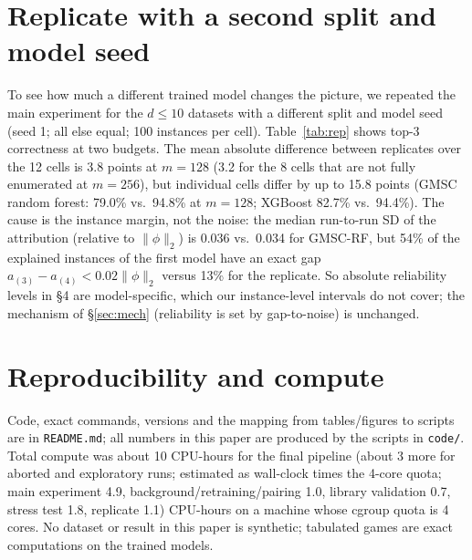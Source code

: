 \documentclass{article}
\begin{document}
\section{Replicate with a second split and model seed}\label{app:rep}
To see how much a different trained model changes the picture, we repeated the main experiment for the $d\le10$ datasets with a different split and model seed (seed 1; all else equal; 100 instances per cell). Table~\ref{tab:rep} shows top-3 correctness at two budgets. The mean absolute difference between replicates over the 12 cells is 3.8 points at $m{=}128$ (3.2 for the 8 cells that are not fully enumerated at $m{=}256$), but individual cells differ by up to 15.8 points (GMSC random forest: 79.0\% vs.\ 94.8\% at $m{=}128$; XGBoost 82.7\% vs.\ 94.4\%). The cause is the instance margin, not the noise: the median run-to-run SD of the attribution (relative to $\|\phi\|_2$) is 0.036 vs.\ 0.034 for GMSC-RF, but 54\% of the explained instances of the first model have an exact gap $a_{(3)}-a_{(4)}<0.02\|\phi\|_2$ versus 13\% for the replicate. So absolute reliability levels in \S4 are model-specific, which our instance-level intervals do not cover; the mechanism of \S\ref{sec:mech} (reliability is set by gap-to-noise) is unchanged.
\begin{table}[h]
\centering\scriptsize\setlength{\tabcolsep}{3pt}

\caption{Main models (seed 0) vs.\ replicate models (split/model seed 1), Kernel SHAP, $d\le10$ datasets; AUC of both models given. ``enum.'': complete enumeration.}\label{tab:rep}
\end{table}

\section{Reproducibility and compute}
Code, exact commands, versions and the mapping from tables/figures to scripts are in \texttt{README.md}; all numbers in this paper are produced by the scripts in \texttt{code/}. Total compute was about 10 CPU-hours for the final pipeline (about 3 more for aborted and exploratory runs; estimated as wall-clock times the 4-core quota; main experiment 4.9, background/retraining/pairing 1.0, library validation 0.7, stress test 1.8, replicate 1.1) CPU-hours on a machine whose cgroup quota is 4 cores. No dataset or result in this paper is synthetic; tabulated games are exact computations on the trained models.


\end{document}
